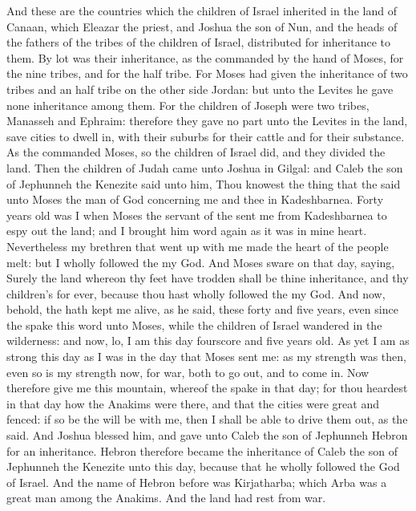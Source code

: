 \begin{biblechapter} %
 And these are the countries which the children of Israel inherited in the land of Canaan, which Eleazar the priest, and Joshua the son of Nun, and the heads of the fathers of the tribes of the children of Israel, distributed for inheritance to them.
\verse By lot was their inheritance, as the \LORD commanded by the hand of Moses, for the nine tribes, and for the half tribe.
\verse For Moses had given the inheritance of two tribes and an half tribe on the other side Jordan: but unto the Levites he gave none inheritance among them.
\verse For the children of Joseph were two tribes, Manasseh and Ephraim: therefore they gave no part unto the Levites in the land, save cities to dwell in, with their suburbs for their cattle and for their substance.
\verse As the \LORD commanded Moses, so the children of Israel did, and they divided the land.
 Then the children of Judah came unto Joshua in Gilgal: and Caleb the son of Jephunneh the Kenezite said unto him, Thou knowest the thing that the \LORD said unto Moses the man of God concerning me and thee in Kadeshbarnea.
\verse Forty years old was I when Moses the servant of the \LORD sent me from Kadeshbarnea to espy out the land; and I brought him word again as it was in mine heart.
\verse Nevertheless my brethren that went up with me made the heart of the people melt: but I wholly followed the \LORD my God.
\verse And Moses sware on that day, saying, Surely the land whereon thy feet have trodden shall be thine inheritance, and thy children's for ever, because thou hast wholly followed the \LORD my God.
\verse And now, behold, the \LORD hath kept me alive, as he said, these forty and five years, even since the \LORD spake this word unto Moses, while the children of Israel wandered in the wilderness: and now, lo, I am this day fourscore and five years old.
\verse As yet I am as strong this day as I was in the day that Moses sent me: as my strength was then, even so is my strength now, for war, both to go out, and to come in.
\verse Now therefore give me this mountain, whereof the \LORD spake in that day; for thou heardest in that day how the Anakims were there, and that the cities were great and fenced: if so be the \LORD will be with me, then I shall be able to drive them out, as the \LORD said.
\verse And Joshua blessed him, and gave unto Caleb the son of Jephunneh Hebron for an inheritance.
\verse Hebron therefore became the inheritance of Caleb the son of Jephunneh the Kenezite unto this day, because that he wholly followed the \LORD God of Israel.
\verse And the name of Hebron before was Kirjatharba; which Arba was a great man among the Anakims. And the land had rest from war.
\end{biblechapter}

